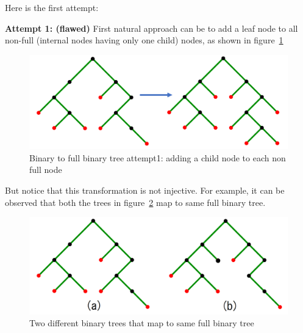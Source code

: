 Here is the first attempt:

\noindent \textbf{Attempt 1: (flawed)} First natural approach can be to add a leaf node to all non-full (internal nodes having only one child) nodes, as shown in figure~\ref{fig:bt-fbt-attempt1}
\begin{figure}[h!]
    \centering
    \includegraphics[width=0.7\linewidth]{images/binary-to-full-binary-1.png}
    \caption{Binary to full binary tree attempt1: adding a child node to each non full node}
    \label{fig:bt-fbt-attempt1}
\end{figure}

But notice that this transformation is not injective. For example, it can be observed that  both the trees in figure~\ref{fig:bt-fbt-attempt1-issue} map to same full binary tree.
\begin{figure}[h!]
    \centering
    \includegraphics[width=0.7\linewidth]{images/binary-to-full-binary-2.png}
    \caption{Two different binary trees that map to same full binary tree}
    \label{fig:bt-fbt-attempt1-issue}
\end{figure}

